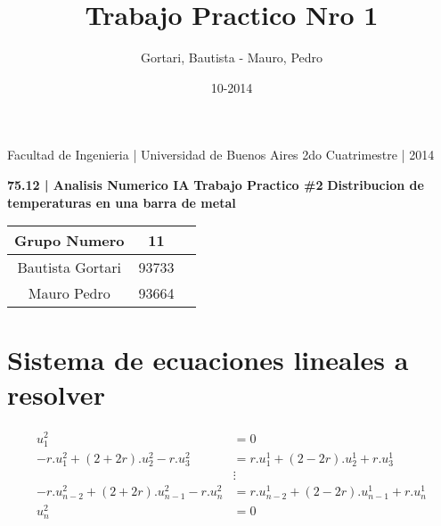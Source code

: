 \documentclass{article}
\title{Trabajo Practico Nro 1}
\date{10-2014}
\author{Gortari, Bautista - Mauro, Pedro}
\begin{document}
\begin{center}
\large{Facultad de Ingenieria | Universidad de Buenos Aires}
\newline
\newline
\large{2do Cuatrimestre | 2014}
\newline
\newline

\huge{\textbf{75.12 | Analisis Numerico IA}}
\newline
\newline
\huge{\textbf{Trabajo Practico \#2}}
\newline
\newline
\large{\textbf{Distribucion de temperaturas en una barra de metal}}
\newline
\newline
\end{center}
\begin{table}[h!]
  \begin{center}
    \label{tab:table1}
    \begin{tabular}{ccc}
      \toprule
      Grupo Numero &11 \\
      \midrule
      Bautista Gortari &93733\\
      \midrule
      Mauro Pedro &93664 \\
      \bottomrule
    \end{tabular}
  \end{center}
\end{table}
\newpage
\tableofcontents
\newpage
{}



\section{Sistema de ecuaciones lineales a resolver}
\begin{align*}
u_1^2 &= 0\\
-r.u_1^2 + (2+2r).u_2^2 - r.u_3^2 &= r.u_1^1 + (2-2r).u_2^1 + r.u_3^1\\
&\vdots\\
-r.u_{n-2}^2 + (2+2r).u_{n-1}^2 - r.u_{n}^2 &= r.u_{n-2}^1 + (2-2r).u_{n-1}^1 + r.u_{n}^1\\
u_n^2&=0\\
\end{align*}
\end{document}
